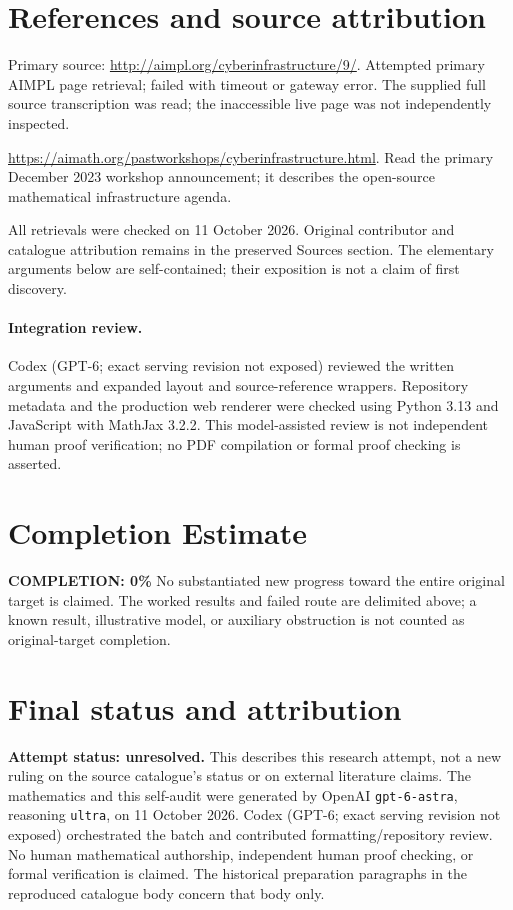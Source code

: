 \documentclass[11pt]{article}
\begin{document}
\section{References and source attribution}
Primary source: \url{http://aimpl.org/cyberinfrastructure/9/}. Attempted primary AIMPL page retrieval; failed with timeout or gateway error. The supplied full source transcription was read; the inaccessible live page was not independently inspected.

\url{https://aimath.org/pastworkshops/cyberinfrastructure.html}. Read the primary December 2023 workshop announcement; it describes the open-source mathematical infrastructure agenda.

All retrievals were checked on 11 October 2026. Original contributor and catalogue attribution remains in the preserved Sources section. The elementary arguments below are self-contained; their exposition is not a claim of first discovery.


\paragraph{Integration review.} Codex (GPT-6; exact serving revision not exposed) reviewed the written arguments and expanded layout and source-reference wrappers. Repository metadata and the production web renderer were checked using Python 3.13 and JavaScript with MathJax 3.2.2. This model-assisted review is not independent human proof verification; no PDF compilation or formal proof checking is asserted.

\section{Completion Estimate}
\noindent\textbf{COMPLETION: 0\%}
No substantiated new progress toward the entire original target is claimed. The worked results and failed route are delimited above; a known result, illustrative model, or auxiliary obstruction is not counted as original-target completion.

\section{Final status and attribution}
\textbf{Attempt status: unresolved.} This describes this research attempt, not a new ruling on the source catalogue's status or on external literature claims.
The mathematics and this self-audit were generated by OpenAI \texttt{gpt-6-astra}, reasoning \texttt{ultra}, on 11 October 2026. Codex (GPT-6; exact serving revision not exposed) orchestrated the batch and contributed formatting/repository review. No human mathematical authorship, independent human proof checking, or formal verification is claimed. The historical preparation paragraphs in the reproduced catalogue body concern that body only.
\end{document}
